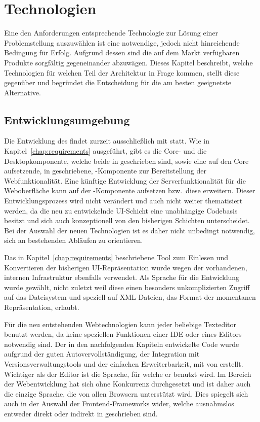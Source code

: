 \chapter{Technologien}\label{chap:technologies}
Eine den Anforderungen entsprechende Technologie zur Lösung einer Problemstellung auszuwählen ist eine notwendige, jedoch nicht hinreichende Bedingung für Erfolg. Aufgrund dessen sind die auf dem Markt verfügbaren Produkte sorgfältig gegeneinander abzuwägen. Dieses Kapitel beschreibt, welche Technologien für welchen Teil der Architektur in Frage kommen, stellt diese gegenüber und begründet die Entscheidung für die am besten geeignetste Alternative.

\section{Entwicklungsumgebung}
Die Entwicklung des  findet zurzeit ausschließlich mit  statt. Wie in Kapitel~\ref{chap:requirements} ausgeführt, gibt es die Core- und die Desktopkomponente, welche beide in  geschrieben sind, sowie eine auf den Core aufsetzende, in  geschriebene, -Komponente zur Bereitstellung der Webfunktionalität. Eine künftige Entwicklung der Serverfunktionalität für die Weboberfläche kann auf der -Komponente aufsetzen bzw.\ diese erweitern. Dieser Entwicklungsprozess wird nicht verändert und auch nicht weiter thematisiert werden, da die neu zu entwickelnde UI-Schicht eine unabhängige Codebasis besitzt und sich auch konzeptionell von den bisherigen Schichten unterscheidet. Bei der Auswahl der neuen Technologien ist es daher nicht unbedingt notwendig, sich an bestehenden Abläufen zu orientieren. 

Das in Kapitel~\ref{chap:requirements} beschriebene Tool zum Einlesen und Konvertieren der bisherigen UI-Repräsentation wurde wegen der vorhandenen, internen Infrastruktur ebenfalls  verwendet. Als Sprache für die Entwicklung wurde  gewählt, nicht zuletzt weil diese einen besonders unkomplizierten Zugriff auf das Dateisystem und speziell auf XML-Dateien, das Format der momentanen Repräsentation, erlaubt. 

Für die neu entstehenden Webtechnologien kann jeder beliebige Texteditor benutzt werden, da keine speziellen Funktionen einer IDE oder eines Editors notwendig sind. Der in den nachfolgenden Kapiteln entwickelte Code wurde aufgrund der guten Autovervollständigung, der Integration mit Versionsverwaltungstools und der einfachen Erweiterbarkeit, mit  von  erstellt. Wichtiger als der Editor ist die Sprache, für welche er benutzt wird. Im Bereich der Webentwicklung hat sich  ohne Konkurrenz durchgesetzt und ist daher auch die einzige Sprache, die von allen Browsern unterstützt wird. Dies spiegelt sich auch in der Auswahl der Frontend-Frameworks wider, welche ausnahmslos entweder direkt oder indirekt in  geschrieben sind.   

